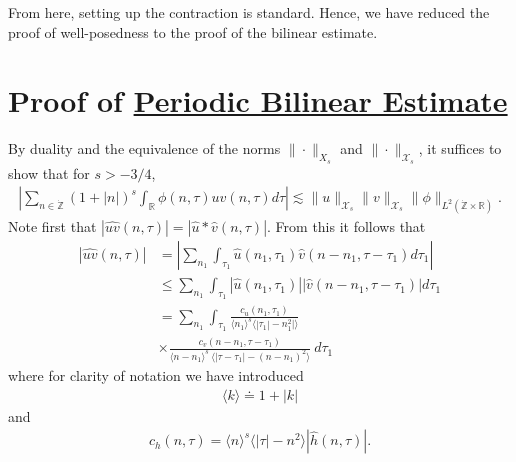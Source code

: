 \documentclass[12pt,reqno]{amsart}
\numberwithin{equation}{section}  %
\newcommand{\rr}{\mathbb{R}}
\newcommand{\zz}{\mathbb{Z}}
\newcommand{\zzdot}{\dot{\zz}}
\newcommand{\wh}{\widehat}
\begin{document}
%
%
From here, setting up the contraction is standard. Hence, we have reduced the proof of well-posedness to the proof of the bilinear estimate.
%
%
%
%
%
%
%
%
\section{Proof of \hyperref[prop:bilinear-est]{Periodic Bilinear Estimate}} 
\label{sec:proof-bilin-est}
By duality and the equivalence of the norms $\| \cdot \|_{X_{s}}$ and $\| \cdot \|_{\mathcal{X}_{s}}$, it suffices to show that for $s > -3/4$, 
%
\begin{equation}
	\label{duality-est}
	\begin{split}
	|	\sum_{n \in \zzdot}  (1 + |n|)^{s}
		\int_{\rr} \phi(n, \tau) \wh{uv}(n, \tau) d \tau | \lesssim \|u\|_{\mathcal{X}_{s}}
    \|v\|_{\mathcal{X}_{s}}
    \|\phi \|_{L^{2}(\zzdot \times \rr)}.
	\end{split}
\end{equation}
Note first that $|\wh{uv}(n, \tau) |  = | \wh{u} *  \wh{v} 
(n, \tau)|$. From this it follows that
%
%
\begin{equation}
	\label{non-lin-rep}
	\begin{split}
		| \wh{uv}(n, \tau)|
    & = | \sum_{n_{1}}  \int_{\tau_{1}}
    \wh{u}\left( n_1,  \tau_1 \right) \wh{v}\left( n - n_1 , \tau - \tau_1   
\right) d \tau_1 |
\\
& \le  \sum_{n_{1}}  \int_{\tau_{1}}
    |\wh{u}\left( n_1,  \tau_1 \right)| |\wh{v}\left( n - n_1 , \tau - \tau_1   
\right)| d \tau_1 
\\
& = \sum_{n_{1}} \int_{\tau_{1}} \frac{c_u\left( n_1, \tau_1 
\right)}{\langle n_1 \rangle ^s \langle |\tau_1| - n_1^{2} | \rangle }
\\
& \times \frac{c_{v}\left( n - n_1, \tau - \tau_1 \right)}{\langle n -
n_1 \rangle ^s\ \langle |\tau - \tau_1 | -  (n - n_1)^{2} \rangle}
  \ d \tau_1 
\end{split}
\end{equation}
%
%
where for clarity of notation we have introduced 
%
%
%
\begin{equation*}
\begin{split}
\langle k \rangle \doteq 1 + |k|
\end{split}
\end{equation*}
%
%
and
%
\begin{equation*}
	\begin{split}
		c_h(n, \tau) =
			\langle n \rangle ^s \langle |\tau| - n^{2} \rangle | \wh{h}\left( n, \tau \right) |.
	\end{split}
\end{equation*}
\end{document}
